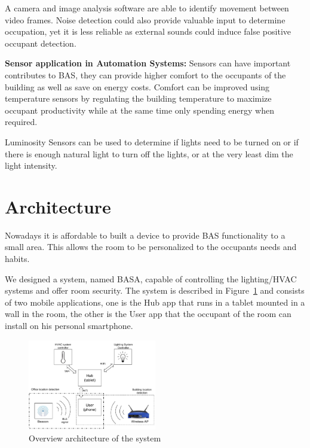 \documentclass[conference]{IEEEtran}
\begin{document}
A camera and image analysis software are able to identify movement between video frames. Noise detection could also provide valuable input to determine occupation, yet it is less reliable as external sounds could induce false positive occupant detection.

 


\textbf{Sensor application in Automation Systems:}
Sensors can have important contributes to \ac{BAS}, they can provide higher comfort to the occupants of the building as well as save on energy costs. Comfort can be improved using temperature sensors by regulating the building temperature to maximize occupant productivity while at the same time only spending energy when required. 

Luminosity Sensors can be used to determine if lights need to be turned on or if there is enough natural light to turn off the lights, or at the very least dim the light intensity.



\section{Architecture}
\label{act}

Nowadays it is affordable to built a device to provide \ac{BAS} functionality to a small area. This allows the room to be personalized to the occupants needs and habits.

We designed a system, named BASA, capable of controlling the lighting/\ac{HVAC} systems and offer room security. The system is described in Figure~\ref{software1} and consists of two mobile applications, one is the Hub app that runs in a tablet mounted in a wall in the room, the other is the User app that the occupant of the room can install on his personal smartphone. 


\begin{figure}[h]
\centering
\includegraphics[width=0.5\textwidth]{Figures/harware_arch}
\caption{Overview architecture of the system}
\label{software1}
\end{figure}
\end{document}
